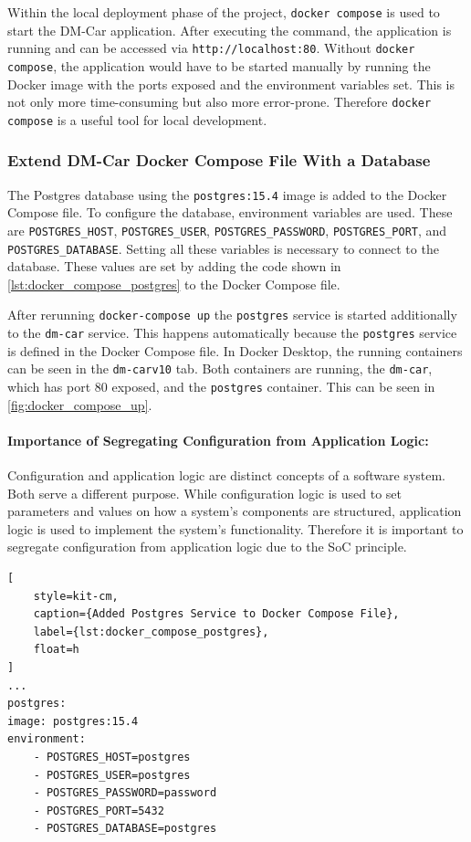 Within the local deployment phase of the project, \texttt{docker compose} is used to start the DM-Car application.
After executing the command, the application is running and can be accessed via \texttt{http://localhost:80}.
Without \texttt{docker compose}, the application would have to be started manually by running the Docker image with the ports exposed and the environment variables set.
This is not only more time-consuming but also more error-prone.
Therefore \texttt{docker compose} is a useful tool for local development.

\subsubsection*{Extend DM-Car Docker Compose File With a Database}
The Postgres database using the \texttt{postgres:15.4} image is added to the Docker Compose file.
To configure the database, environment variables are used.
These are \texttt{POSTGRES\_HOST}, \texttt{POSTGRES\_USER}, \texttt{POSTGRES\_PASSWORD}, \texttt{POSTGRES\_PORT}, and \texttt{POSTGRES\_DATABASE}.
Setting all these variables is necessary to connect to the database.
These values are set by adding the code shown in \autoref*{lst:docker_compose_postgres} to the Docker Compose file.

After rerunning \texttt{docker-compose up} the \texttt{postgres} service is started additionally to the \texttt{dm-car} service.
This happens automatically because the \texttt{postgres} service is defined in the Docker Compose file.
In Docker Desktop, the running containers can be seen in the \texttt{dm-carv10} tab.
Both containers are running, the \texttt{dm-car}, which has port 80 exposed, and the \texttt{postgres} container.
This can be seen in \autoref*{fig:docker_compose_up}.

\paragraph*{Importance of Segregating Configuration from Application Logic:}
Configuration and application logic are distinct concepts of a software system.
Both serve a different purpose.
While configuration logic is used to set parameters and values on how a system's components are structured, application logic is used to implement the system's functionality.
Therefore it is important to segregate configuration from application logic due to the SoC principle.

\begin{lstlisting}[
    style=kit-cm,
    caption={Added Postgres Service to Docker Compose File},
    label={lst:docker_compose_postgres},
    float=h
]
...
postgres:
image: postgres:15.4
environment:
    - POSTGRES_HOST=postgres
    - POSTGRES_USER=postgres
    - POSTGRES_PASSWORD=password
    - POSTGRES_PORT=5432
    - POSTGRES_DATABASE=postgres
\end{lstlisting}


